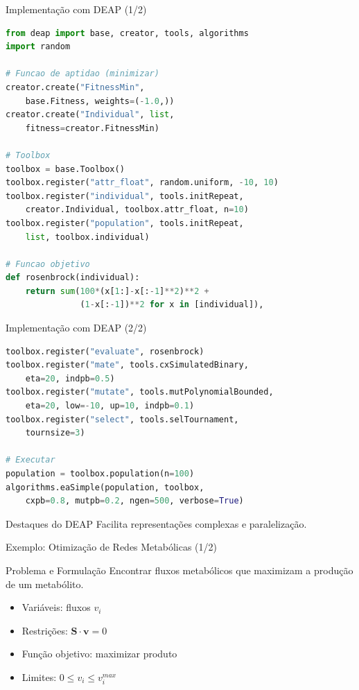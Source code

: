 \begin{frame}[fragile]{Implementação com DEAP (1/2)}
\begin{lstlisting}[language=Python, caption=GA com DEAP, basicstyle=\ttfamily\scriptsize]
from deap import base, creator, tools, algorithms
import random

# Funcao de aptidao (minimizar)
creator.create("FitnessMin", 
    base.Fitness, weights=(-1.0,))
creator.create("Individual", list, 
    fitness=creator.FitnessMin)

# Toolbox
toolbox = base.Toolbox()
toolbox.register("attr_float", random.uniform, -10, 10)
toolbox.register("individual", tools.initRepeat,
    creator.Individual, toolbox.attr_float, n=10)
toolbox.register("population", tools.initRepeat, 
    list, toolbox.individual)

# Funcao objetivo
def rosenbrock(individual):
    return sum(100*(x[1:]-x[:-1]**2)**2 + 
               (1-x[:-1])**2 for x in [individual]),
\end{lstlisting}
\end{frame}

\begin{frame}[fragile]{Implementação com DEAP (2/2)}
\begin{lstlisting}[language=Python, basicstyle=\ttfamily\scriptsize]
toolbox.register("evaluate", rosenbrock)
toolbox.register("mate", tools.cxSimulatedBinary,
    eta=20, indpb=0.5)
toolbox.register("mutate", tools.mutPolynomialBounded,
    eta=20, low=-10, up=10, indpb=0.1)
toolbox.register("select", tools.selTournament,
    tournsize=3)

# Executar
population = toolbox.population(n=100)
algorithms.eaSimple(population, toolbox,
    cxpb=0.8, mutpb=0.2, ngen=500, verbose=True)
\end{lstlisting}

\begin{block}{Destaques do DEAP}
Facilita representações complexas e paralelização.
\end{block}
\end{frame}

\begin{frame}{Exemplo: Otimização de Redes Metabólicas (1/2)}
\begin{block}{Problema e Formulação}
Encontrar fluxos metabólicos que maximizam a produção de um metabólito.
\begin{itemize}
    \item Variáveis: fluxos $v_i$
    \item Restrições: $\mathbf{S} \cdot \mathbf{v} = 0$
    \item Função objetivo: maximizar produto
    \item Limites: $0 \leq v_i \leq v_i^{max}$
\end{itemize}
\end{block}
\end{frame}

